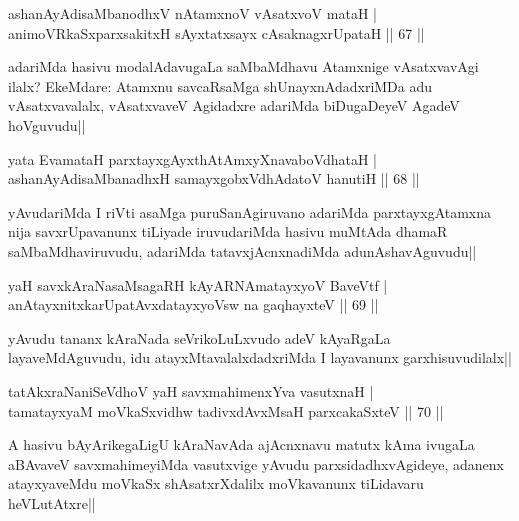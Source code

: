 \begin{shl}
ashanAyAdisaMbanodhxV nA\s \s tamxnoV vAsatxvoV mataH |\\
animoVRkaSxparxsakitxH sAyxtatxsayx cAsaknagxrUpataH \hfill || 67 ||
\end{shl}

\begin{artha}
adariMda hasivu modalAdavugaLa saMbaMdhavu Atamxnige vAsatxvavAgi ilalx? EkeMdare: Atamxnu savcaRsaMga shUnayxnAdadxriMDa adu vAsatxvavalalx, vAsatxvaveV Agidadxre adariMda biDugaDeyeV AgadeV hoVguvudu||
\end{artha}

\begin{shl}
yata EvamataH parxtayxgAyxthAtAmxyXnavaboVdhataH |\\
ashanAyAdisaMbanadhxH samayxgobxVdhAdatoV hanutiH \hfill || 68 ||
\end{shl}

\begin{artha}
yAvudariMda I riVti asaMga puruSanAgiruvano adariMda parxtayxgAtamxna nija savxrUpavanunx tiLiyade iruvudariMda hasivu muMtAda dhamaR saMbaMdhaviruvudu, adariMda tatavxjAcnxnadiMda adunAshavAguvudu||
\end{artha}


\begin{shl}
yaH savxkAraNasaMsagaRH kAyARNAmatayxyoV BaveVtf |\\
anAtayxnitxkarUpatAvxdatayxyoV\s sw na gaqhayxteV \hfill || 69 ||
\end{shl}

\begin{artha}
yAvudu tananx kAraNada seVrikoLuLxvudo adeV kAyaRgaLa layaveMdAguvudu, idu atayxMtavalalxdadxriMda I layavanunx garxhisuvudilalx||
\end{artha}


\begin{shl}
tatAkxraNaniSeVdhoV yaH savxmahimenxYva vasutxnaH |\\
tamatayxyaM moVkaSxvidhw tadivxdAvxMsaH parxcakaSxteV \hfill || 70 ||
\end{shl}

\begin{artha}
A hasivu bAyArikegaLigU kAraNavAda ajAcnxnavu matutx kAma ivugaLa aBAvaveV savxmahimeyiMda vasutxvige yAvudu parxsidadhxvAgideye, adanenx atayxyaveMdu moVkaSx shAsatxrXdalilx moVkavanunx tiLidavaru heVLutAtxre||
\end{artha}

